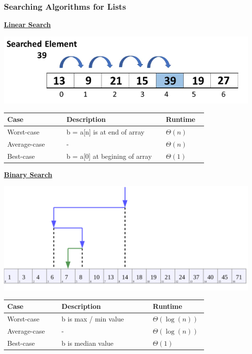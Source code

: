 \subsubsection{Searching Algorithms for Lists}
    {\centering\underline{\textbf{Linear Search}} \par}
        \includegraphics*[width = 0.8\linewidth]{src/3_containers/images/linear_search.png}
        
        \begin{tabular*}{\linewidth}{| p{0.25\linewidth} | p{0.42\linewidth} | p{0.15\linewidth} |}
            \hline
            Case & Description & Runtime\\
            \hline \hline
            Worst-case & b = a[n] is at end of array & $\Theta(n)$ \\
            \hline
            Average-case & - & $\Theta(n)$ \\
            \hline
            Best-case & b = a[0] at begining of array & $\Theta(1)$ \\
            \hline
        \end{tabular*}

    {\centering\underline{\textbf{Binary Search}} \par}
        \includegraphics*[width = 0.8\linewidth]{src/3_containers/images/binary_search.png}
        
        \begin{tabular*}{\linewidth}{| p{0.25\linewidth} | p{0.42\linewidth} | p{0.15\linewidth} |}
            \hline
            Case & Description & Runtime\\
            \hline \hline
            Worst-case & b is max / min value & $\Theta(\log(n))$ \\
            \hline
            Average-case & - & $\Theta(\log(n))$ \\
            \hline
            Best-case & b is median value & $\Theta(1)$ \\
            \hline
        \end{tabular*}
